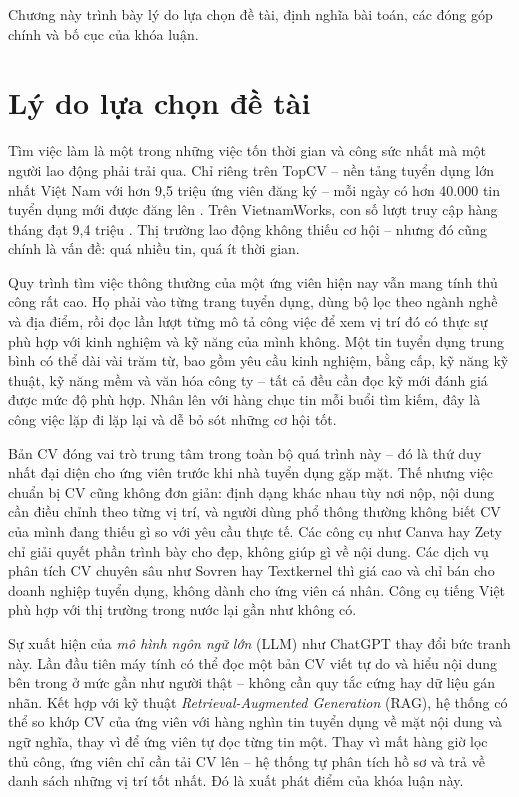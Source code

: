 \documentclass[../DoAn.tex]{subfiles}
\begin{document}
Chương này trình bày lý do lựa chọn đề tài, định nghĩa bài toán, các đóng góp chính và bố cục của khóa luận.

\section{Lý do lựa chọn đề tài}
\label{sec:dvd}

Tìm việc làm là một trong những việc tốn thời gian và công sức nhất mà một người lao động phải trải qua. Chỉ riêng trên TopCV -- nền tảng tuyển dụng lớn nhất Việt Nam với hơn 9,5 triệu ứng viên đăng ký \cite{topcv2024} -- mỗi ngày có hơn 40.000 tin tuyển dụng mới được đăng lên \cite{topcv2024report}. Trên VietnamWorks, con số lượt truy cập hàng tháng đạt 9,4 triệu \cite{vietnamworks2023}. Thị trường lao động không thiếu cơ hội -- nhưng đó cũng chính là vấn đề: quá nhiều tin, quá ít thời gian.

Quy trình tìm việc thông thường của một ứng viên hiện nay vẫn mang tính thủ công rất cao. Họ phải vào từng trang tuyển dụng, dùng bộ lọc theo ngành nghề và địa điểm, rồi đọc lần lượt từng mô tả công việc để xem vị trí đó có thực sự phù hợp với kinh nghiệm và kỹ năng của mình không. Một tin tuyển dụng trung bình có thể dài vài trăm từ, bao gồm yêu cầu kinh nghiệm, bằng cấp, kỹ năng kỹ thuật, kỹ năng mềm và văn hóa công ty -- tất cả đều cần đọc kỹ mới đánh giá được mức độ phù hợp. Nhân lên với hàng chục tin mỗi buổi tìm kiếm, đây là công việc lặp đi lặp lại và dễ bỏ sót những cơ hội tốt.

Bản CV đóng vai trò trung tâm trong toàn bộ quá trình này -- đó là thứ duy nhất đại diện cho ứng viên trước khi nhà tuyển dụng gặp mặt. Thế nhưng việc chuẩn bị CV cũng không đơn giản: định dạng khác nhau tùy nơi nộp, nội dung cần điều chỉnh theo từng vị trí, và người dùng phổ thông thường không biết CV của mình đang thiếu gì so với yêu cầu thực tế. Các công cụ như Canva hay Zety chỉ giải quyết phần trình bày cho đẹp, không giúp gì về nội dung. Các dịch vụ phân tích CV chuyên sâu như Sovren hay Textkernel thì giá cao và chỉ bán cho doanh nghiệp tuyển dụng, không dành cho ứng viên cá nhân. Công cụ tiếng Việt phù hợp với thị trường trong nước lại gần như không có.

Sự xuất hiện của \textit{mô hình ngôn ngữ lớn} (LLM) như ChatGPT \cite{openai2023gpt4} thay đổi bức tranh này. Lần đầu tiên máy tính có thể đọc một bản CV viết tự do và hiểu nội dung bên trong ở mức gần như người thật -- không cần quy tắc cứng hay dữ liệu gán nhãn. Kết hợp với kỹ thuật \textit{Retrieval-Augmented Generation} (RAG), hệ thống có thể so khớp CV của ứng viên với hàng nghìn tin tuyển dụng về mặt nội dung và ngữ nghĩa, thay vì để ứng viên tự đọc từng tin một. Thay vì mất hàng giờ lọc thủ công, ứng viên chỉ cần tải CV lên -- hệ thống tự phân tích hồ sơ và trả về danh sách những vị trí tốt nhất. Đó là xuất phát điểm của khóa luận này.
\end{document}
